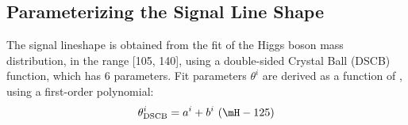 %

\subsection{Parameterizing the Signal Line Shape}
\label{sec:SignalParametrization}
The signal lineshape is obtained from the fit of the Higgs boson mass distribution, 
in the range [105, 140]\GeV, using a double-sided Crystal Ball (DSCB) function, which has 6 parameters.
Fit parameters $\theta^i$ are derived as a function of \mH, using a first-order polynomial:
\[
\theta^{i}_\text{DSCB} = a^i + b^{i}~(\mH - 125)%
\]


